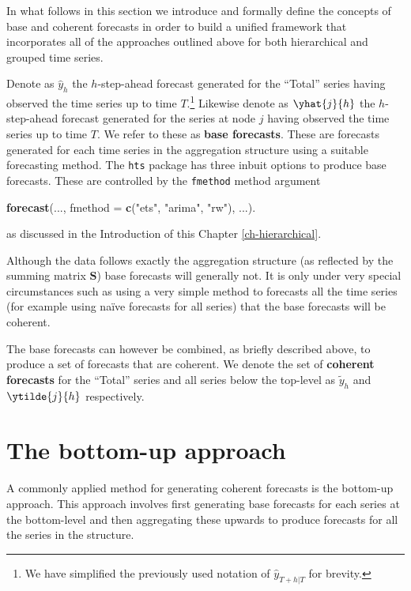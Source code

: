 \documentclass[]{book}
\newenvironment{Shaded}{\begin{snugshade}}{\end{snugshade}}
\newcommand{\DataTypeTok}[1]{\textcolor[rgb]{0.13,0.29,0.53}{#1}}
\newcommand{\KeywordTok}[1]{\textcolor[rgb]{0.13,0.29,0.53}{\textbf{#1}}}
\newcommand{\NormalTok}[1]{#1}
\newcommand{\StringTok}[1]{\textcolor[rgb]{0.31,0.60,0.02}{#1}}
\let\rmarkdownfootnote\footnote%
\def\footnote{\protect\rmarkdownfootnote}
\begin{document}
In what follows in this section we introduce and formally define the concepts of base and coherent forecasts in order to build a unified framework that incorporates all of the approaches outlined above for both hierarchical and grouped time series.

Denote as \(\hat{y}_{h}\) the \(h\)-step-ahead forecast generated for the ``Total'' series having observed the time series up to time \(T\).\footnote{We have simplified the previously used notation of \(\hat{y}_{T+h|T}\) for brevity.} Likewise denote as \(\yhat{j}{h}\) the \(h\)-step-ahead forecast generated for the series at node \(j\) having observed the time series up to time \(T\). We refer to these as \textbf{base forecasts}. These are forecasts generated for each time series in the aggregation structure using a suitable forecasting method. The \texttt{hts} package has three inbuit options to produce base forecasts. These are controlled by the \texttt{fmethod} method argument

\begin{Shaded}
\begin{Highlighting}[]
\KeywordTok{forecast}\NormalTok{(..., }\DataTypeTok{fmethod =} \KeywordTok{c}\NormalTok{(}\StringTok{"ets"}\NormalTok{, }\StringTok{"arima"}\NormalTok{, }\StringTok{"rw"}\NormalTok{), ...). }
\end{Highlighting}
\end{Shaded}

as discussed in the Introduction of this Chapter \ref{ch-hierarchical}.

Although the data follows exactly the aggregation structure (as reflected by the summing matrix \(\bm{S}\)) base forecasts will generally not. It is only under very special circumstances such as using a very simple method to forecasts all the time series (for example using naïve forecasts for all series) that the base forecasts will be coherent.

The base forecasts can however be combined, as briefly described above, to produce a set of forecasts that are coherent. We denote the set of \textbf{coherent forecasts} for the ``Total'' series and all series below the top-level as \(\tilde{y}_{h}\) and \(\ytilde{j}{h}\) respectively.

\hypertarget{Hier:bu}{%
\section{The bottom-up approach}\label{Hier:bu}}

A commonly applied method for generating coherent forecasts is the bottom-up approach. This approach involves first generating base forecasts for each series at the bottom-level and then aggregating these upwards to produce forecasts for all the series in the structure.
\end{document}
